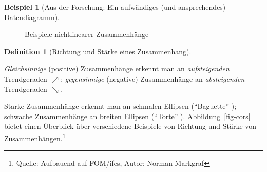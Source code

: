 \documentclass[
  a4paper,
]{scrbook}
\theoremstyle{definition}
\newtheorem{example}{Beispiel}[chapter]
\theoremstyle{definition}
\newtheorem{definition}{Definition}[chapter]
\theoremstyle{definition}
\theoremstyle{remark}
\begin{document}
\begin{example}[Aus der Forschung: Ein aufwändiges (und ansprechendes)
Datendiagramm]
\begin{figure}


\caption{\label{fig-nonlinear}Beispiele nichtlinearer Zusammenhänge}

\end{figure}%

\begin{definition}[Richtung und Stärke eines
Zusammenhang]\protect\hypertarget{def-zshg}{}\label{def-zshg}

\emph{Gleichsinnige} (positive) Zusammenhänge erkennt man an
\emph{aufsteigenden} Trendgeraden \(\nearrow\); \emph{gegensinnige}
(negative) Zusammenhänge an \emph{absteigenden} Trendgeraden
\(\searrow\).

Starke Zusammenhänge erkennt man an schmalen Ellipsen (``Baguette'' );
schwache Zusammenhänge an breiten Ellipsen (``Torte'' ).
Abbildung~\ref{fig-cors} bietet einen Überblick über verschiedene
Beispiele von Richtung und Stärke von Zusammenhängen.\footnote{Quelle:
  Aufbauend auf FOM/ifes, Autor: Norman Markgraf}

\begin{figure}

\centering{

}
\end{figure}
\end{definition}
\end{example}
\end{document}
